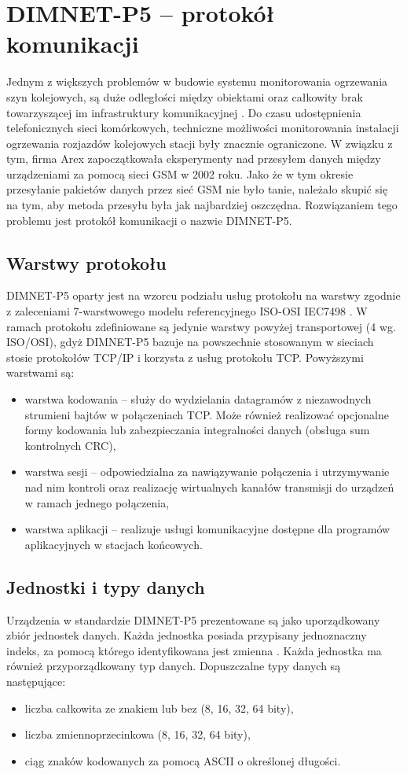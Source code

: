 \section{DIMNET-P5 -- protokół komunikacji}
Jednym z większych problemów w budowie systemu monitorowania ogrzewania szyn kolejowych, są duże odległości między obiektami oraz całkowity brak towarzyszącej im infrastruktury komunikacyjnej \cite{dimnetp5-spec}. Do czasu udostępnienia telefonicznych sieci komórkowych, techniczne możliwości monitorowania instalacji ogrzewania rozjazdów kolejowych stacji były znacznie ograniczone. W związku z tym, firma Arex zapoczątkowała eksperymenty nad przesyłem danych między urządzeniami za pomocą sieci GSM w 2002 roku. Jako że w tym okresie przesyłanie pakietów danych przez sieć GSM nie było tanie, należało skupić się na tym, aby metoda przesyłu była jak najbardziej oszczędna. Rozwiązaniem tego problemu jest protokół komunikacji o nazwie \mbox{DIMNET-P5}.

\subsection{Warstwy protokołu}
\mbox{DIMNET-P5} oparty jest na wzorcu podziału usług protokołu na warstwy zgodnie z zaleceniami 7-warstwowego modelu referencyjnego ISO-OSI IEC7498 \cite{dimnetp5-spec}. W ramach protokołu zdefiniowane są jedynie warstwy powyżej transportowej (4 wg. ISO/OSI), gdyż \mbox{DIMNET-P5} bazuje na powszechnie stosowanym w sieciach stosie protokołów TCP/IP i korzysta z usług protokołu TCP. Powyższymi warstwami są:
\begin{itemize}
\item warstwa kodowania -- służy do wydzielania datagramów z niezawodnych strumieni bajtów w połączeniach TCP. Może również realizować opcjonalne formy kodowania lub zabezpieczania integralności danych (obsługa sum kontrolnych CRC),
\item warstwa sesji -- odpowiedzialna za nawiązywanie połączenia i utrzymywanie nad nim kontroli oraz realizację wirtualnych kanałów transmisji do urządzeń w ramach jednego połączenia,
\item warstwa aplikacji -- realizuje usługi komunikacyjne dostępne dla programów aplikacyjnych w stacjach końcowych.
\end{itemize}

\subsection{Jednostki i typy danych}
Urządzenia w standardzie \mbox{DIMNET-P5} prezentowane są jako uporządkowany zbiór jednostek danych. Każda jednostka posiada przypisany jednoznaczny indeks, za pomocą którego identyfikowana jest zmienna \cite{dimnetp5-spec}. Każda jednostka ma również przyporządkowany typ danych. Dopuszczalne typy danych są następujące:
\begin{itemize}
\item liczba całkowita ze znakiem lub bez (8, 16, 32, 64 bity),
\item liczba zmiennoprzecinkowa (8, 16, 32, 64 bity),
\item ciąg znaków kodowanych za pomocą ASCII o określonej długości.
\end{itemize}

